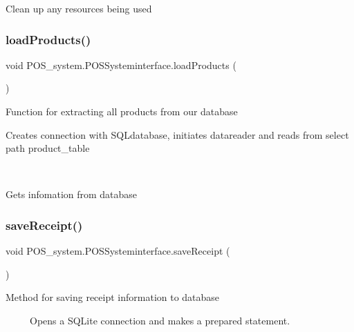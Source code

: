 Clean up any resources being used 

\mbox{\label{class_p_o_s__system_1_1_p_o_s_systeminterface_ad88d52f27c5388b16220ca666b164ef7}} 
\subsubsection{\texorpdfstring{load\+Products()}{loadProducts()}}
{\footnotesize\ttfamily void P\+O\+S\+\_\+system.\+P\+O\+S\+Systeminterface.\+load\+Products (\begin{DoxyParamCaption}{ }\end{DoxyParamCaption})}



Function for extracting all products from our database 

Creates connection with S\+Q\+Ldatabase, initiates datareader and reads from select path product\+\_\+table 

~\newline
 

Gets infomation from database \mbox{\label{class_p_o_s__system_1_1_p_o_s_systeminterface_a75da901a01d10aa7273ecf4b64cd3617}} 
\subsubsection{\texorpdfstring{save\+Receipt()}{saveReceipt()}}
{\footnotesize\ttfamily void P\+O\+S\+\_\+system.\+P\+O\+S\+Systeminterface.\+save\+Receipt (\begin{DoxyParamCaption}{ }\end{DoxyParamCaption})}



Method for saving receipt information to database 

~\newline
~\newline
~\newline
Opens a S\+Q\+Lite connection and makes a prepared statement. 

